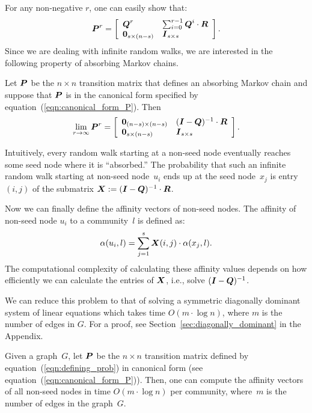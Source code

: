 For any non-negative $r$, one can easily show that:
\begin{equation}\label{exp:rth_product_of_P}
	\boldsymbol{P}^r = \left [ \begin{array}{ll}
						\boldsymbol{Q}^r  					& \sum_{i = 0}^{r - 1}\boldsymbol{Q}^i \cdot \boldsymbol{R} \\
						 \boldsymbol{0}_{s \times (n - s)} & \boldsymbol{I}_{s \times s}
						\end{array}
				\right ].
\end{equation}  
Since we are dealing with infinite random walks, we are interested in the following 
property of absorbing Markov chains.
\begin{proposition}\label{prop:limiting_Q}
	Let $\boldsymbol{P}$ be the $n \times n$ transition matrix that defines an absorbing Markov chain
	and suppose that $\boldsymbol{P}$ is in the canonical form specified by equation~(\ref{eqn:canonical_form_P}). 
	Then
    \begin{equation}
        \lim_{r \to \infty} \boldsymbol{P}^r = \left [ \begin{array}{ll}
            \boldsymbol{0}_{(n - s) \times (n - s)} & (\boldsymbol{I} - \boldsymbol{Q})^{-1} \cdot \boldsymbol{R} \\
            \boldsymbol{0}_{s \times (n - s)}       & \boldsymbol{I}_{s \times s}
        \end{array}
        \right ].
    \end{equation}  
\end{proposition}
Intuitively, every random walk starting at a non-seed node eventually 
reaches some seed node where it is ``absorbed.'' The probability 
that such an infinite random walk starting at non-seed node~$u_i$ ends 
up at the seed node~$x_j$ is entry $(i, j)$ of the 
submatrix $\boldsymbol{X} := (\boldsymbol{I} - \boldsymbol{Q})^{-1} \cdot \boldsymbol{R}$. 

Now we can finally define the affinity vectors of non-seed nodes.
The affinity of non-seed node $u_i$ to a community~$l$ is defined as:
\begin{equation}\label{eqn:belonging_vector}
    \alpha (u_i, l) = \sum_{j = 1}^{s} \boldsymbol{X} (i, j) \cdot \alpha (x_j, l).
\end{equation}
The computational complexity of calculating these affinity values  
depends on how efficiently we can calculate the entries of $\boldsymbol{X}$, 
i.e., solve $(\boldsymbol{I} - \boldsymbol{Q})^{-1}$. 

We can reduce this problem to that of solving a symmetric diagonally dominant 
system of linear equations which takes time $O(m \cdot \log n)$, where $m$
is the number of edges in $G$. For a proof, see Section~\ref{sec:diagonally_dominant} in the Appendix.  
\begin{theorem}\label{theorem:computing_NR}
Given a graph~$G$, let $\boldsymbol{P}$ be the $n \times n$ transition matrix 
defined by equation~(\ref{eqn:defining_prob}) in canonical form 
(see equation~(\ref{eqn:canonical_form_P})). Then, one can compute 
the affinity vectors of all non-seed nodes in time $O(m \cdot \log n)$ per community, 
where~$m$ is the number of edges in the graph~$G$.
\end{theorem}  



